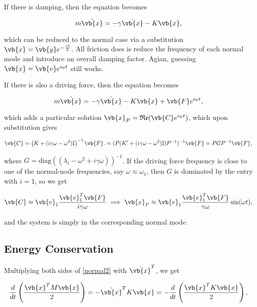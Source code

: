 \documentclass[a4paper,12pt]{report}
\begin{document}
If there is damping, then the equation becomes 

\begin{equation}
    m \ddot{\vb{x} } = -\gamma \dot{\vb{x} }-K\vb{x},  
\end{equation}

which can be reduced to the normal case via a substitution \(\vb{x} = \vb{y} e^{-\frac{\gamma t}{2} } \). All friction does is reduce the frequency of each normal mode and introduce an overall damping factor. Agian, guessing \(\vb{x} = \vb{v} e^{i \omega t} \) still works. 

If there is also a driving force, then the equation becomes

\begin{equation}
    m \ddot{\vb{x} } = -\gamma \dot{\vb{x} } - K\vb{x} + \vb{F} e^{i \omega t} ,  
\end{equation}

which adds a particular solution \(\vb{x}_{P}  = \mathfrak{Re} (\vb{C} e^{i \omega t} ) \), which upon substitution gives 

\begin{equation}
    \vb{C} = \left( K+(i \gamma \omega -\omega ^2)\mathbb{I} \right)^{-1} \vb{F}. = (P(K' + (i \gamma \omega - \omega ^2)\mathbb{I})P^{-1} )^{-1} \vb{F} = PGP^{-1} \vb{F} ,
\end{equation}

where \(G = \text{diag}((\lambda _{i} - \omega ^2+i \gamma \omega  ))^{-1}  \). If the driving force frequency is close to one of the normal-node frequencies, say \(\omega \approx \omega _{1} \), then \(G\) is dominated by the entry with \(i = 1\), so we get 

\begin{equation}
    \vb{C} \approx \vb{v} _{1} \frac{\vb{v} _{1} ^T \vb{F} }{i \gamma \omega }  \implies \vb{x} _{P} \approx \vb{v} _{1} \frac{\vb{v} _{1} ^T \vb{F}  }{\gamma \omega }\sin (\omega t),
\end{equation}

and the system is simply in the corresponding normal mode.

\subsection{Energy Conservation}

Multiplying both sides of \cref{normal2} with \(\dot{\vb{x} }^T \), we get

\begin{equation}
    \frac{d}{dt} \left(\frac{\vb{x} ^TM\vb{x} }{2}\right) = - \dot{\vb{x} }^TK\vb{x} = -\frac{d}{dt} \left( \frac{\vb{x}^T K \vb{x} }{2}  \right),  
\end{equation}
\end{document}
